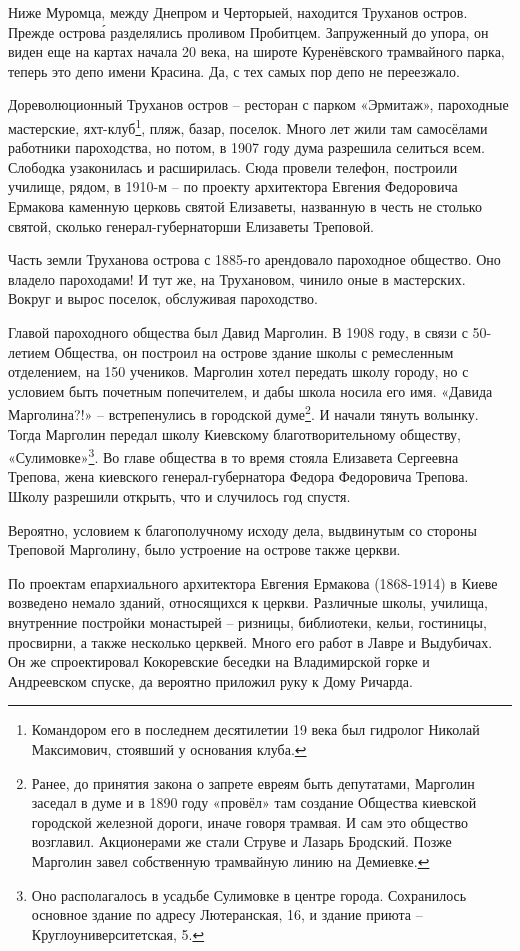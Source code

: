 Ниже Муромца, между Днепром и Черторыей, находится Труханов остров. Прежде остров\'а разделялись проливом Пробитцем. Запруженный до упора, он виден еще на картах начала 20 века, на широте Куренёвского трамвайного парка, теперь это депо имени Красина. Да, с тех самых пор депо не переезжало.

Дореволюционный Труханов остров – ресторан с парком «Эрмитаж», пароходные мастерские, яхт-клуб\footnote{Командором его в последнем десятилетии 19 века был гидролог Николай Максимович, стоявший у основания клуба.}, пляж, базар, поселок. Много лет жили там самосёлами работники пароходства, но потом, в 1907 году дума разрешила селиться всем. Слободка узаконилась и расширилась. Сюда провели телефон, построили училище, рядом, в 1910-м – по проекту архитектора Евгения Федоровича Ермакова каменную церковь святой Елизаветы, названную в честь не столько святой, сколько генерал-губернаторши Елизаветы Треповой.

Часть земли Труханова острова с 1885-го арендовало пароходное общество. Оно владело пароходами! И тут же, на Трухановом, чинило оные в мастерских. Вокруг и вырос поселок, обслуживая пароходство.

Главой пароходного общества был Давид Марголин. В 1908 году, в связи с 50-летием Общества, он построил на острове здание школы с ремесленным отделением, на 150 учеников. Марголин хотел передать школу городу, но с условием быть почетным попечителем, и дабы школа носила его имя. «Давида Марголина?!» – встрепенулись в городской думе\footnote{Ранее, до принятия закона о запрете евреям быть депутатами, Марголин  заседал в думе и в 1890 году «провёл» там создание Общества киевской городской железной дороги, иначе говоря трамвая. И сам это общество возглавил. Акционерами же стали Струве и Лазарь Бродский. Позже Марголин завел собственную трамвайную линию на Демиевке.}. И начали тянуть волынку. Тогда Марголин передал школу Киевскому благотворительному обществу, «Сулимовке»\footnote{Оно располагалось в усадьбе Сулимовке в центре города. Сохранилось основное здание по адресу Лютеранская, 16, и здание приюта – Круглоуниверситетская, 5.}. Во главе общества в то время стояла Елизавета Сергеевна Трепова, жена киевского генерал-губернатора Федора Федоровича Трепова. Школу разрешили открыть, что и случилось год спустя.

Вероятно, условием к благополучному исходу дела, выдвинутым со стороны Треповой Марголину, было устроение на острове также церкви.

По проектам епархиального архитектора Евгения Ермакова (1868-1914) в Киеве возведено немало зданий, относящихся к церкви. Различные школы, училища, внутренние постройки монастырей – ризницы, библиотеки, кельи, гостиницы, просвирни, а также несколько церквей. Много его работ в Лавре и Выдубичах. Он же спроектировал Кокоревские беседки на Владимирской горке и Андреевском спуске, да вероятно приложил руку к Дому Ричарда.

